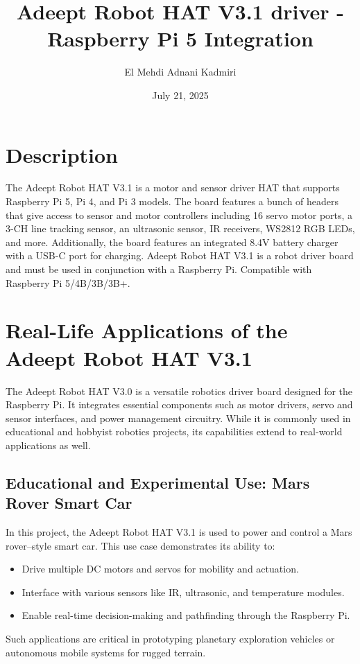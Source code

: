 \documentclass{article}
\title{Adeept Robot HAT V3.1 driver - Raspberry Pi 5 Integration}
\author{El Mehdi Adnani Kadmiri}
\date{July 21, 2025}
\begin{document}
	\maketitle
	\section{Description}
	The Adeept Robot HAT V3.1 is a motor and sensor driver HAT that supports Raspberry Pi 5, Pi 4, and Pi 3 models. The board features a bunch of headers that give access to sensor and motor controllers including 16 servo motor ports, a 3-CH line tracking sensor, an ultrasonic sensor, IR receivers, WS2812 RGB LEDs, and more. Additionally, the board features an integrated 8.4V battery charger with a USB-C port for charging.
	Adeept Robot HAT V3.1 is a robot driver board and must be used in conjunction with a Raspberry Pi. Compatible with Raspberry Pi 5/4B/3B/3B+.
	
	\section{Real-Life Applications of the Adeept Robot HAT V3.1}
	
	The Adeept Robot HAT V3.0 is a versatile robotics driver board designed for the Raspberry Pi. It integrates essential components such as motor drivers, servo and sensor interfaces, and power management circuitry. While it is commonly used in educational and hobbyist robotics projects, its capabilities extend to real-world applications as well.
	
	\subsection*{Educational and Experimental Use: Mars Rover Smart Car}
	
	In this project, the Adeept Robot HAT V3.1 is used to power and control a Mars rover–style smart car. This use case demonstrates its ability to:
	\begin{itemize}
		\item Drive multiple DC motors and servos for mobility and actuation.
		\item Interface with various sensors like IR, ultrasonic, and temperature modules.
		\item Enable real-time decision-making and pathfinding through the Raspberry Pi.
	\end{itemize}
	Such applications are critical in prototyping planetary exploration vehicles or autonomous mobile systems for rugged terrain.
	
\end{document}
